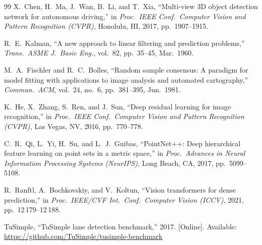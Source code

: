 \documentclass[12pt,a4paper]{article}
\begin{document}
\begin{thebibliography}{99}
X.~Chen, H.~Ma, J.~Wan, B.~Li, and T.~Xia,
``Multi-view 3D object detection network for autonomous driving,''
in \textit{Proc.\ IEEE Conf.\ Computer Vision and Pattern Recognition
(CVPR)}, Honolulu, HI, 2017, pp.~1907--1915.

R.~E.~Kalman,
``A new approach to linear filtering and prediction problems,''
\textit{Trans.\ ASME J.\ Basic Eng.}, vol.~82, pp.~35--45, Mar.\ 1960.

M.~A.~Fischler and R.~C.~Bolles,
``Random sample consensus: A paradigm for model fitting with applications
to image analysis and automated cartography,''
\textit{Commun.\ ACM}, vol.~24, no.~6, pp.~381--395, Jun.\ 1981.

K.~He, X.~Zhang, S.~Ren, and J.~Sun,
``Deep residual learning for image recognition,''
in \textit{Proc.\ IEEE Conf.\ Computer Vision and Pattern Recognition
(CVPR)}, Las Vegas, NV, 2016, pp.~770--778.

C.~R.~Qi, L.~Yi, H.~Su, and L.~J.~Guibas,
``PointNet++: Deep hierarchical feature learning on point sets in a metric
space,''
in \textit{Proc.\ Advances in Neural Information Processing Systems
(NeurIPS)}, Long Beach, CA, 2017, pp.~5099--5108.

R.~Ranftl, A.~Bochkovskiy, and V.~Koltun,
``Vision transformers for dense prediction,''
in \textit{Proc.\ IEEE/CVF Int.\ Conf.\ Computer Vision (ICCV)}, 2021,
pp.~12\,179--12\,188.

TuSimple,
``TuSimple lane detection benchmark,''
2017. [Online].
Available: \url{https://github.com/TuSimple/tusimple-benchmark}

\end{thebibliography}
\end{document}
